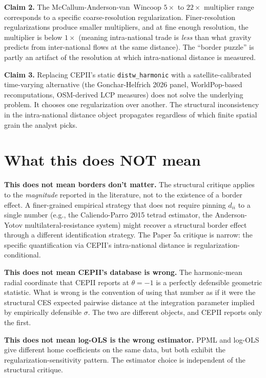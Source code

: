 \documentclass[11pt,letterpaper,oneside]{book}
\theoremstyle{definition}
\theoremstyle{remark}
\begin{document}
\textbf{Claim 2.} The McCallum-Anderson-van~Wincoop $5\times$ to
$22\times$ multiplier range corresponds to a specific coarse-resolution
regularization. Finer-resolution regularizations produce smaller
multipliers, and at fine enough resolution, the multiplier is below
$1\times$ (meaning intra-national trade is \emph{less} than what
gravity predicts from inter-national flows at the same distance). The
``border puzzle'' is partly an artifact of the resolution at which
intra-national distance is measured.

\textbf{Claim 3.} Replacing CEPII's static \texttt{distw\_harmonic}
with a satellite-calibrated time-varying alternative (the
Gonchar-Helfrich 2026 panel, WorldPop-based recomputations, OSM-derived
LCP measures) does not solve the underlying problem. It chooses one
regularization over another. The structural inconsistency in the
intra-national distance object propagates regardless of which finite
spatial grain the analyst picks.

\section{What this does NOT mean}

\textbf{This does not mean borders don't matter.} The structural
critique applies to the \emph{magnitude} reported in the literature,
not to the existence of a border effect. A finer-grained empirical
strategy that does not require pinning $d_{ii}$ to a single number
(e.g., the Caliendo-Parro 2015 tetrad estimator, the Anderson-Yotov
multilateral-resistance system) might recover a structural border effect
through a different identification strategy. The Paper 5a critique is
narrow: the specific quantification via CEPII's intra-national distance
is regularization-conditional.

\textbf{This does not mean CEPII's database is wrong.} The harmonic-mean
radial coordinate that CEPII reports at $\theta = -1$ is a perfectly
defensible geometric statistic. What is wrong is the convention of
using that number as if it were the structural CES expected pairwise
distance at the integration parameter implied by empirically defensible
$\sigma$. The two are different objects, and CEPII reports only the
first.

\textbf{This does not mean log-OLS is the wrong estimator.} PPML and
log-OLS give different home coefficients on the same data, but both
exhibit the regularization-sensitivity pattern. The estimator choice
is independent of the structural critique.
\end{document}
